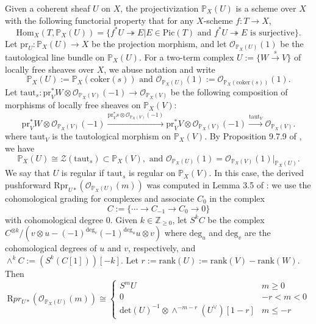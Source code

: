 \documentclass{amsart}
\numberwithin{equation}{section}
\newcommand\mc{\mathcal}
\newcommand\mb{\mathbb}
\newcommand{\rank}{\mathrm{rank}}
\newcommand{\pr}{\mathrm{pr}}
\newcommand{\taut}{\mathrm{taut}}
\theoremstyle{definition}
\theoremstyle{remark}
\begin{document}
Given a coherent sheaf $U$ on $X$, the projectivization $\mb{P}_{X}(U)$ is a scheme over $X$ with the following functorial property that for any $X$-scheme $f:T\to X$,
$$\mathrm{Hom}_{X}(T,\mb{P}_{X}(U))=\{f^{*}U\twoheadrightarrow E|E\in \mathrm{Pic}(T) \text{ and } f^{*}U\twoheadrightarrow E \text{ is surjective}\}.$$
Let $\pr_{U}:\mb{P}_{X}(U)\to X$ be the projection morphism, and let $\mc{O}_{\mb{P}_{X}(U)}(1)$ be the tautological line bundle on $\mb{P}_{X}(U)$. For a two-term complex $U:=\{W\xrightarrow{s} V\}$ of locally free sheaves over $X$, we abuse notation and write
\begin{equation*}
\mb{P}_{X}(U):=\mb{P}_{X}(\mathrm{coker}(s)) \text{ and } \mc{O}_{\mb{P}_{X}(U)}(1):=\mc{O}_{\mb{P}_{X}(\mathrm{coker}(s))}(1).
\end{equation*}
Let $\taut_{s}:\pr_{V}^{*}W\otimes \mc{O}_{\mb{P}_{X}(V)}(-1)\to \mc{O}_{\mb{P}_{X}(V)}$ be the following composition of morphisms of locally free sheaves on $\mb{P}_{X}(V)$:
 \begin{equation*}
    \pr_{V}^{*}W\otimes \mc{O}_{\mb{P}_{X}(V)}(-1)\xrightarrow{\pr_{V}^{*}s\otimes \mc{O}_{\mb{P}_{X}(V)}(-1)} \pr_{V}^{*}V\otimes \mc{O}_{\mb{P}_{X}(V)}(-1)\xrightarrow{\taut_{V}} \mc{O}_{\mb{P}_{X}(V)}. 
  \end{equation*}
where $\taut_{V}$ is the tautological morphism on $\mb{P}_{X}(V)$. By Proposition 9.7.9 of \cite{EGA}, we have
\begin{equation}
  \label{eq:projectivization}
\mb{P}_{X}(U)\cong \mc{Z}(\taut_{s})\subset\mb{P}_{X}(V), \text{ and }\mc{O}_{\mb{P}_{X}(U)}(1)=\mc{O}_{\mb{P}_{X}(V)}(1)|_{\mb{P}_{X}(U)}.  
\end{equation} 
We say that $U$ is regular if $\taut_{s}$ is regular on $\mb{P}_{X}(V)$. In this case, the derived pushforward $\mathrm{R}\pr_{U*}(\mathcal{O}_{\mb{P}_{X}(U)}(m))$ was computed in Lemma 3.5 of \cite{zhao2020categorical}: we use the cohomological grading for complexes and associate $C_0$ in the complex $$C:=\{\cdots \to C_{-1}\to C_0\to 0\}$$ with cohomological degree $0$. Given $k\in \mb{Z}_{\geq 0}$, let $S^{k}C$ be the complex $C^{\otimes k}/(v\otimes u-(-1)^{\mathrm{deg}_{v}}(-1)^{\mathrm{deg}_{u}}u\otimes v)$ where $\mathrm{deg}_{u}$ and $\mathrm{deg}_{v}$ are the cohomological degrees of $u$ and $v$, respectively, and $\wedge^{k}C:=(S^{k}(C[1]))[-k]$. Let $r:=\rank(U):=\rank(V)-\rank(W)$. Then
  \begin{equation}
\label{hart}
     \mathrm{R}pr_{U*}(\mathcal{O}_{\mb{P}_{X}(U)}(m))\cong  \begin{cases}
      S^{m}U & m\geq 0\\
      0 & -r<m<0 \\
      \mathrm{det}(U)^{-1}\otimes \wedge^{-m-r}(U^{\vee})[1-r]& m\leq -r  
    \end{cases}
  \end{equation}
\end{document}
